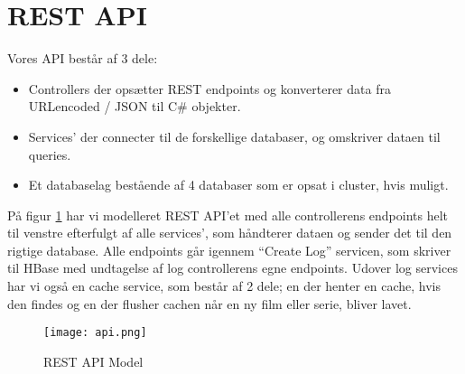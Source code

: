 \section{REST API}
\label{section:rest_api}
Vores API består af 3 dele:
\begin{itemize}
    \item Controllers der opsætter REST endpoints og konverterer data fra URLencoded / JSON til C\# objekter.
    \item Services’ der connecter til de forskellige databaser, og omskriver dataen til queries.
    \item Et databaselag bestående af 4 databaser som er opsat i cluster, hvis muligt.
\end{itemize}
På figur \ref{fig::api} har vi modelleret REST API’et med alle controllerens endpoints helt til venstre efterfulgt af alle services’, som håndterer dataen og sender det til den rigtige database. Alle endpoints går igennem “Create Log” servicen, som skriver til HBase med undtagelse af log controllerens egne endpoints. Udover log services har vi også en cache service, som består af 2 dele; en der henter en cache, hvis den findes og en der flusher cachen når en ny film eller serie, bliver lavet.

\begin{figure}[H]
    \centering
    \texttt{[image: api.png]}
    \caption{REST API Model}
    \label{fig::api}
\end{figure}